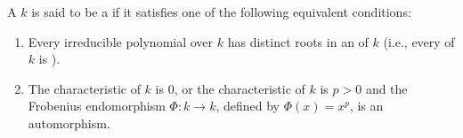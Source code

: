 \begin{definition} \label{definition:perfect_field}
A  $k$ is said to be a  if it satisfies one of the following equivalent conditions:
\begin{enumerate}
    \item Every irreducible polynomial over $k$ has distinct roots in an  of $k$ (i.e., every  of $k$ is ).
    \item The characteristic of $k$ is $0$, or the characteristic of $k$ is $p > 0$ and the Frobenius endomorphism $\Phi: k \to k$, defined by $\Phi(x) = x^p$, is an automorphism.
\end{enumerate}
\end{definition}